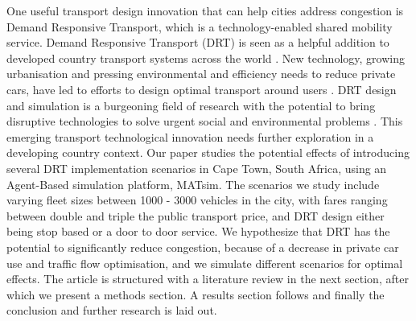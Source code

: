 \documentclass[a4paper]{article}
\begin{document}
One useful transport design innovation that can help cities address congestion is Demand Responsive Transport, which is a technology-enabled shared mobility service. Demand Responsive Transport (DRT) is seen  as a helpful addition to developed country transport systems across the world \citep{Ben-dor, engelhardt2019quantifying, schluter2021impact, kaddoura2020impact,maggi2021price, miskolczi2021urban, zwick2021ride, article}. New technology, growing urbanisation and pressing environmental and efficiency needs to reduce private cars, have led to efforts to design optimal transport around users \citep{ronald2015simulating}. DRT design and simulation is a burgeoning field of research with the potential to bring disruptive technologies to solve urgent social and environmental problems \citep{schluter2021impact}. This emerging transport technological  innovation needs further exploration in a developing country context. Our paper studies the potential effects of introducing several DRT implementation scenarios in Cape Town, South Africa, using an Agent-Based simulation platform, MATsim. The scenarios we study include varying fleet sizes between 1000 - 3000 vehicles in the city, with fares ranging between double and triple the public transport price, and DRT design either being stop based or a door to door service. We hypothesize that DRT has the potential to significantly reduce congestion, because of a decrease in private car use and traffic flow optimisation, and we simulate different scenarios for optimal effects. The article is structured with a literature review in the next section, after which we present a methods section. A results section follows and finally the conclusion and further research is laid out. \\



\end{document}
